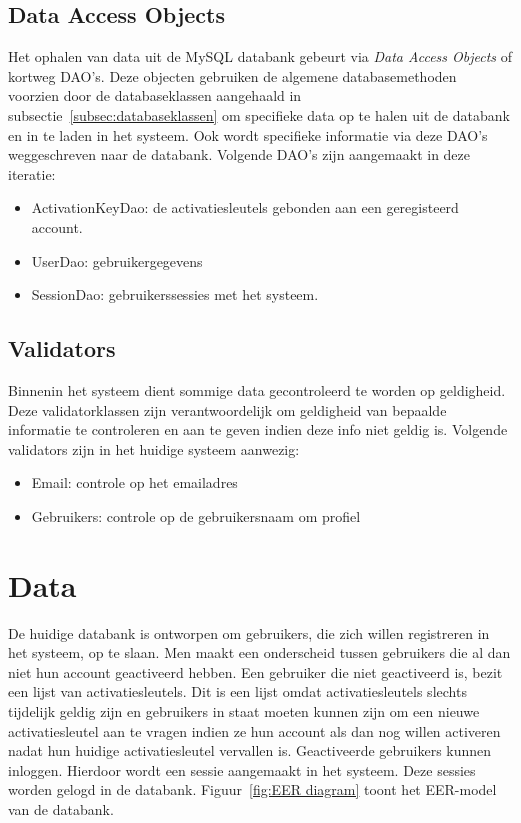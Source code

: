 \subsection{Data Access Objects}
\label{subsec:dao}

Het ophalen van data uit de MySQL databank gebeurt via \emph{Data Access Objects} of kortweg DAO's. 
Deze objecten gebruiken de algemene databasemethoden voorzien door de databaseklassen aangehaald in subsectie~\ref{subsec:databaseklassen} om specifieke data op te halen uit de databank en in te laden in het systeem. 
Ook wordt specifieke informatie via deze DAO's weggeschreven naar de databank. 
Volgende DAO's zijn aangemaakt in deze iteratie:

\begin{itemize}
	\item ActivationKeyDao: de activatiesleutels gebonden aan een geregisteerd account. 
	\item UserDao: gebruikergegevens
	\item SessionDao: gebruikerssessies met het systeem.
\end{itemize}

\subsection{Validators}
\label{subsec:validators}

Binnenin het systeem dient sommige data gecontroleerd te worden op geldigheid. 
Deze validatorklassen zijn verantwoordelijk om geldigheid van bepaalde informatie te controleren en aan te geven indien deze info niet geldig is. 
Volgende validators zijn in het huidige systeem aanwezig:

\begin{itemize}
	\item Email: controle op het emailadres
	\item Gebruikers: controle op de gebruikersnaam om profiel
\end{itemize}

\section{Data}
\label{sec:data}

De huidige databank is ontworpen om gebruikers, die zich willen registreren in het systeem, op te slaan. 
Men maakt een onderscheid tussen gebruikers die al dan niet hun account geactiveerd hebben. 
Een gebruiker die niet geactiveerd is, bezit een lijst van activatiesleutels. 
Dit is een lijst omdat activatiesleutels slechts tijdelijk geldig zijn en gebruikers in staat moeten kunnen zijn om een nieuwe activatiesleutel aan te vragen indien ze hun account als dan nog willen activeren nadat hun huidige activatiesleutel vervallen is.
Geactiveerde gebruikers kunnen inloggen. 
Hierdoor wordt een sessie aangemaakt in het systeem. 
Deze sessies worden gelogd in de databank. Figuur~\ref{fig:EER diagram} toont het EER-model van de databank.

